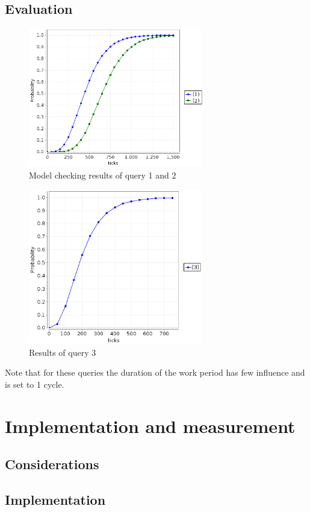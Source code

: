 \documentclass[a4paper, 10pt]{article}
\begin{document}
\subsection{Evaluation}
\begin{figure}[htbp]
	\centering
	\includegraphics[width=3in]{one-and-all}
	\caption{Model checking results of query 1 and 2}
	\label{fig:one-and-all}
\end{figure}
\begin{figure}[htbp]
	\centering
	\includegraphics[width=3in]{one2all}
	\caption{Results of query 3}
	\label{fig:one2all}
\end{figure}

Note that for these queries the duration of the work period has few influence and is set to 1 cycle.

\section{Implementation and measurement}
\subsection{Considerations}
\subsection{Implementation}
\end{document}
